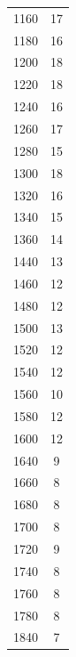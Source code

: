 \begin{table}
\begin{tabular}{c|c}
1160&	17\\ 

1180&	16\\ 

1200&	18\\ 

1220&	18\\ 

1240&	16	\\ 

1260&	17\\ 

1280&	15\\ 

1300&	18\\ 

1320&	16\\ 

1340&	15\\ 

1360&	14\\ 

1440&	13\\ 

1460&	12\\ 

1480&	12	\\ 

1500&	13\\ 

1520&	12\\ 

1540&	12\\ 

1560&	10	\\ 

1580&	12\\ 

1600&	12\\ 

1640&	9\\ 

1660&	8\\ 

1680&	8\\ 

1700&	8\\ 

1720&	9\\ 

1740&	8\\ 

1760&	8\\ 

1780&	8\\ 

1840&	7\\ 


\end{tabular}
\end{table}
